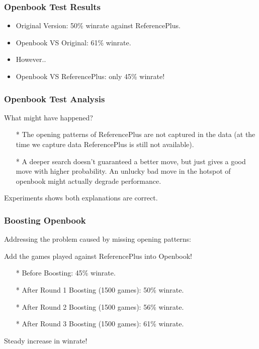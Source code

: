 \documentclass[10pt]{beamer}
\begin{document}
	\begin{frame}
		\frametitle{Openbook Test Results}

		\begin{itemize}
		\item Original Version: \textcolor{fgreen}{50\%} winrate against ReferencePlus.
		\item Openbook VS Original: \textcolor{fgreen}{61\%} winrate.\pause
		\item However..
		\item Openbook VS ReferencePlus: only \textcolor{dred}{45\%} winrate!
		\end{itemize}
	\end{frame}

	\begin{frame}
		\frametitle{Openbook Test Analysis}

		What might have happened?

		\begin{itemize}
		\item[*] The opening patterns of ReferencePlus are not captured in the data
		(at the time we capture data ReferencePlus is still not available).
		\item[*] A deeper search doesn't guaranteed a better move, but just gives a good move with higher probability.
		An unlucky bad move in the hotspot of openbook might actually degrade performance.
		\end{itemize}

		Experiments shows \textcolor{fgreen}{both} explanations are correct.
	\end{frame}

	\begin{frame}
		\frametitle{Boosting Openbook}

		Addressing the problem caused by missing opening patterns:

		\textcolor{fgreen}{Add the games played against ReferencePlus into Openbook!}

		\begin{itemize}
		\item[*] Before Boosting: \textcolor{dred}{45\%} winrate.
		\item[*] After Round 1 Boosting (1500 games): \textcolor{fgreen}{50\%} winrate.
		\item[*] After Round 2 Boosting (1500 games): \textcolor{fgreen}{56\%} winrate.
		\item[*] After Round 3 Boosting (1500 games): \textcolor{fgreen}{61\%} winrate.
		\end{itemize}

		Steady increase in winrate!
	\end{frame}
\end{document}

